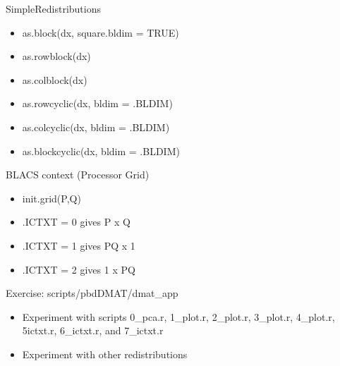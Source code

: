 \begin{frame}
  \begin{block}{SimpleRedistributions}\pause
  \begin{itemize}
\item as.block(dx, square.bldim = TRUE)
\item as.rowblock(dx)
\item as.colblock(dx)
\item as.rowcyclic(dx, bldim = .BLDIM)
\item as.colcyclic(dx, bldim = .BLDIM)
\item as.blockcyclic(dx, bldim = .BLDIM)
  \end{itemize}
  \end{block}
  \begin{block}{BLACS context (Processor Grid)}\pause
  \begin{itemize}
\item init.grid(P,Q)
\item .ICTXT = 0 gives P x Q 
\item .ICTXT = 1 gives PQ x 1
\item .ICTXT = 2 gives 1 x PQ
  \end{itemize}
  \end{block}
\end{frame}

\begin{frame}
  \begin{block}{Exercise: scripts/pbdDMAT/dmat\_app}\pause
  \begin{itemize}
  \item Experiment with scripts 0\_pca.r, 1\_plot.r, 2\_plot.r,
    3\_plot.r, 4\_plot.r, 5\-ictxt.r, 6\_ictxt.r, and 7\_ictxt.r
  \item Experiment with other redistributions
  \end{itemize}
  \end{block}
\end{frame}

